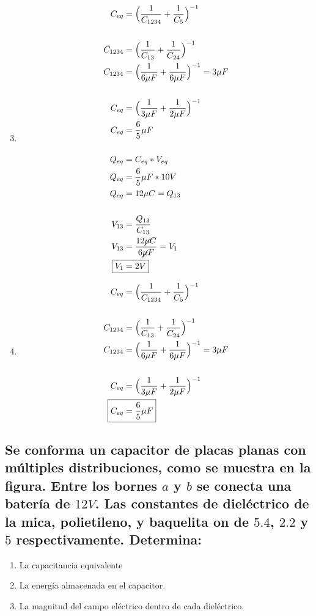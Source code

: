 \documentclass[10pt, twoside]{article}
\begin{document}
	\begin{enumerate}[label=\alph*.]
		\setcounter{enumi}{2}
		\item
			\begin{align*}
				C_{eq} &= \Big{(} \frac{1}{C_{1234}}+ \frac{1}{C_5}  \Big{)}^{-1}\\
				\\
				C_{1234} &= \Big{(} \frac{1}{C_{13}}+ \frac{1}{C_{24}}  \Big{)}^{-1}\\
				C_{1234} &= \Big{(} \frac{1}{6\mu F}+ \frac{1}{6\mu F}  \Big{)}^{-1} = 3\mu F\\
				\\
				C_{eq} &= \Big{(} \frac{1}{3\mu F}+ \frac{1}{2\mu F}  \Big{)}^{-1}\\
				C_{eq} &= \frac{6}{5}\mu F\\
				\\
				Q_{eq} &= C_{eq}*V_{eq}\\
				Q_{eq} &= \frac{6}{5}\mu F*10V\\
				Q_{eq} &= 12\mu C = Q_{13}\\
				\\
				V_{13} &= \frac{Q_{13}}{C_{13}} \\
				V_{13} &= \frac{12\cancel{\mu} C}{6\cancel{\mu} F} = V_1\\
				\Aboxed
				{
					V_1 &= 2V
				}
			\end{align*}
		\item
			\begin{align*}
				C_{eq} &= \Big{(} \frac{1}{C_{1234}}+ \frac{1}{C_5}  \Big{)}^{-1}\\
				\\
				C_{1234} &= \Big{(} \frac{1}{C_{13}}+ \frac{1}{C_{24}}  \Big{)}^{-1}\\
				C_{1234} &= \Big{(} \frac{1}{6\mu F}+ \frac{1}{6\mu F}  \Big{)}^{-1} = 3\mu F\\
				\\
				C_{eq} &= \Big{(} \frac{1}{3\mu F}+ \frac{1}{2\mu F}  \Big{)}^{-1}\\
				\Aboxed
				{
					C_{eq} &= \frac{6}{5}\mu F
				}
			\end{align*}
	\end{enumerate}

\subsection*{Se conforma un capacitor de placas planas con múltiples
	distribuciones, como se muestra en la figura.
	Entre los bornes $a$ y $b$ se conecta una batería de $12V$.
	Las constantes de dieléctrico de la mica, polietileno, y baquelita on de $5.4$,
	$2.2$ y $5$ respectivamente. Determina:
	}
\begin{enumerate}
	\item La capacitancia equivalente
	\item La energía almacenada en el capacitor.
	\item La magnitud del campo eléctrico dentro de cada dieléctrico.
\end{enumerate}
\begin{figure}[H]
	\centering
	
\end{figure}
\end{document}
